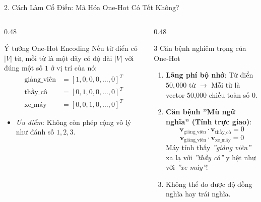 \documentclass[aspectratio=169, 10pt]{beamer}
\begin{document}
\begin{frame}{2. Cách Làm Cổ Điển: Mã Hóa One-Hot Có Tốt Không?}
  \begin{columns}[T, onlytextwidth]
    \begin{column}{0.48\textwidth}
      \begin{block}{Ý tưởng One-Hot Encoding}
        \fontsize{7.5}{9.5}\selectfont
        Nếu từ điển có $|V|$ từ, mỗi từ là một dãy có độ dài $|V|$ với đúng một số $1$ ở vị trí của nó:
        \begin{align*}
          \text{giảng\_viên} &= [1, 0, 0, 0, \dots, 0]^T \\
          \text{thầy\_cô} &= [0, 1, 0, 0, \dots, 0]^T \\
          \text{xe\_máy} &= [0, 0, 1, 0, \dots, 0]^T
        \end{align*}
        \begin{itemize}
          \item \textit{Ưu điểm}: Không còn phép cộng vô lý như đánh số $1, 2, 3$.
        \end{itemize}
      \end{block}
    \end{column}
    \hfill
    \begin{column}{0.48\textwidth}
      \begin{alertblock}{3 Căn bệnh nghiêm trọng của One-Hot}
        \fontsize{7.5}{9.5}\selectfont
        \begin{enumerate}\setlength{\itemsep}{0.2em}
          \item \textbf{Lãng phí bộ nhớ}: Từ điển $50,000$ từ $\to$ Mỗi từ là vector 50,000 chiều toàn số 0.
          \item \textbf{Căn bệnh ''Mù ngữ nghĩa'' (Tính trực giao)}:
            $$\mathbf{v}_{\text{giảng\_viên}} \cdot \mathbf{v}_{\text{thầy\_cô}} = 0$$
            $$\mathbf{v}_{\text{giảng\_viên}} \cdot \mathbf{v}_{\text{xe\_máy}} = 0$$
            Máy tính thấy \textit{''giảng viên''} xa lạ với \textit{''thầy cô''} y hệt như với \textit{''xe máy''}!
          \item Không thể đo được độ đồng nghĩa hay trái nghĩa.
        \end{enumerate}
      \end{alertblock}
    \end{column}
  \end{columns}
\end{frame}
\end{document}
